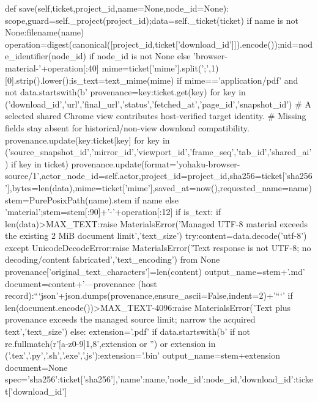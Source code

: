    def save(self,ticket,project_id,name=None,node_id=None):
        scope,guard=self._project(project_id);data=self._ticket(ticket)
        if name is not None:filename(name)
        operation=digest(canonical([project_id,ticket['download_id']]).encode());nid=node_identifier(node_id) if node_id is not None else 'browser-material-'+operation[:40]
        mime=ticket['mime'].split(';',1)[0].strip().lower();is_text=text_mime(mime)
        if mime=='application/pdf' and not data.startswith(b'%
        provenance={key:ticket.get(key) for key in ('download_id','url','final_url','status','fetched_at','page_id','snapshot_id')}
        # A selected shared Chrome view contributes host-verified target identity.
        # Missing fields stay absent for historical/non-view download compatibility.
        provenance.update({key:ticket[key] for key in ('source_snapshot_id','mirror_id','viewport_id','frame_seq','tab_id','shared_ai') if key in ticket})
        provenance.update(format='yohaku-browser-source/1',actor_node_id=self.actor,project_id=project_id,sha256=ticket['sha256'],bytes=len(data),mime=ticket['mime'],saved_at=now(),requested_name=name)
        stem=PurePosixPath(name).stem if name else 'material';stem=stem[:90]+'-'+operation[:12]
        if is_text:
            if len(data)>MAX_TEXT:raise MaterialsError('Managed UTF-8 material exceeds the existing 2 MiB document limit','text_size')
            try:content=data.decode('utf-8')
            except UnicodeDecodeError:raise MaterialsError('Text response is not UTF-8; no decoding/content fabricated','text_encoding') from None
            provenance['original_text_characters']=len(content)
            output_name=stem+'.md'
            document=content+'\n\n---\nAcquisition provenance (host record):\n```json\n'+json.dumps(provenance,ensure_ascii=False,indent=2)+'\n```\n'
            if len(document.encode())>MAX_TEXT-4096:raise MaterialsError('Text plus provenance exceeds the managed source limit; narrow the acquired text','text_size')
        else:
            extension='.pdf' if data.startswith(b'%
            if not re.fullmatch(r'\.[a-z0-9]{1,8}',extension or '') or extension in ('.tex','.py','.sh','.exe','.js'):extension='.bin'
            output_name=stem+extension
            document=None
        spec={'sha256':ticket['sha256'],'name':name,'node_id':node_id,'download_id':ticket['download_id']}
